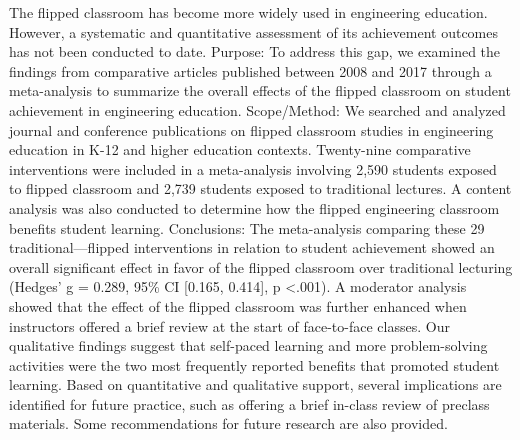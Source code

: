 The flipped classroom has become more widely used in engineering education. However, a systematic and quantitative assessment of its achievement outcomes has not been conducted to date. Purpose: To address this gap, we examined the findings from comparative articles published between 2008 and 2017 through a meta-analysis to summarize the overall effects of the flipped classroom on student achievement in engineering education. Scope/Method: We searched and analyzed journal and conference publications on flipped classroom studies in engineering education in K-12 and higher education contexts. Twenty-nine comparative interventions were included in a meta-analysis involving 2,590 students exposed to flipped classroom and 2,739 students exposed to traditional lectures. A content analysis was also conducted to determine how the flipped engineering classroom benefits student learning. Conclusions: The meta-analysis comparing these 29 traditional—flipped interventions in relation to student achievement showed an overall significant effect in favor of the flipped classroom over traditional lecturing (Hedges' g = 0.289, 95\% CI [0.165, 0.414], p <.001). A moderator analysis showed that the effect of the flipped classroom was further enhanced when instructors offered a brief review at the start of face-to-face classes. Our qualitative findings suggest that self-paced learning and more problem-solving activities were the two most frequently reported benefits that promoted student learning. Based on quantitative and qualitative support, several implications are identified for future practice, such as offering a brief in-class review of preclass materials. Some recommendations for future research are also provided.\cite{Lo2019}

